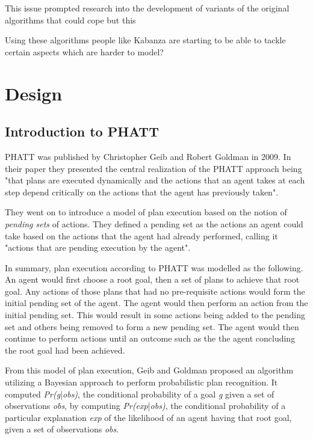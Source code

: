 \documentclass[parskip]{cs4rep}
\begin{document}
This issue prompted research into the development of variants of the original algorithms that could cope but this 

Using these algorithms people like Kabanza are starting to be able to tackle certain aspects which are harder to model?

\chapter{Design}

\section{Introduction to PHATT}

PHATT was published by Christopher Geib and Robert Goldman in 2009. In their paper they presented the central realization of the PHATT approach being "that plans are executed dynamically and the actions that an agent takes at each step depend critically on the actions that the agent has previously taken". 

They went on to introduce a model of plan execution based on the notion of \textit{pending sets} of actions. They defined a pending set as the actions an agent could take based on the actions that the agent had already performed, calling it "actions that are pending execution by the agent".

In summary, plan execution according to PHATT was modelled as the following. An agent would first choose a root goal, then a set of plans to achieve that root goal. Any actions of those plans that had no pre-requisite actions would form the initial pending set of the agent. The agent would then perform an action from the initial pending set. This would result in some actions being added to the pending set and others being removed to form a new pending set. The agent would then continue to perform actions until an outcome such as the the agent concluding the root goal had been achieved.

From this model of plan execution, Geib and Goldman proposed an algorithm utilizing a Bayesian approach to perform probabilistic plan recognition. It computed \textit{Pr(g}|\textit{obs)}, the conditional probability of a goal \textit{g} given a set of observations \textit{obs}, by computing \textit{Pr(exp}|\textit{obs)}, the conditional probability of a particular explanation \textit{exp} of the likelihood of an agent having that root goal, given a set of observations \textit{obs}.
\end{document}
